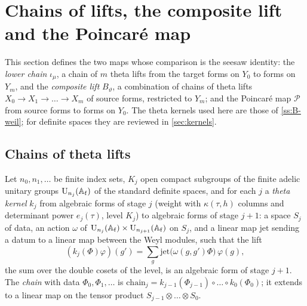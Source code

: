 \section{Chains of lifts, the composite lift and the Poincar\'e map}\label{sec:chains}

This section defines the two maps whose comparison is the seesaw identity: the \emph{lower chain}
$\iota_\mu$, a chain of $m$ theta lifts from the target forms on $Y_0$ to forms on $Y_m$, and the
\emph{composite lift} $B_\vartheta$, a combination of chains of theta lifts $X_0\to X_1\to\dots\to X_m$ of source
forms, restricted to $Y_m$; and the Poincar\'e map $\mathcal P$ from source forms to forms on $Y_0$. The
theta kernels used here are those of \cref{ss:B-weil}; for definite spaces they are reviewed in
\cref{sec:kernels}.

\subsection{Chains of theta lifts}\label{ss:chain-lifts}
Let $n_0,n_1,\dots$ be finite index sets, $K_j$ open compact subgroups of the finite adelic unitary groups
$\operatorname{U}_{n_j}(\mathbb{A}_{\mathrm f})$ of the standard definite spaces, and for each $j$ a \emph{theta kernel} $k_j$ from
algebraic forms of stage $j$ (weight with $\kappa(\tau,h)$ columns and determinant power $e_j(\tau)$, level
$K_j$) to algebraic forms of stage $j+1$: a space $S_j$ of data, an action $\omega$ of
$\operatorname{U}_{n_j}(\mathbb{A}_{\mathrm f})\times\operatorname{U}_{n_{j+1}}(\mathbb{A}_{\mathrm f})$ on $S_j$, and a linear map $\mathrm{jet}$ sending a
datum to a linear map between the Weyl modules, such that the lift
\[
  (k_j(\Phi)\varphi)(g')=\sum_{g}\mathrm{jet}\bigl(\omega(g,g')\Phi\bigr)\,\varphi(g),
\]
the sum over the double cosets of the level, is an algebraic form of stage $j+1$. The \emph{chain} with data
$\Phi_0,\Phi_1,\dots$ is $\mathrm{chain}_j=k_{j-1}(\Phi_{j-1})\circ\dots\circ k_0(\Phi_0)$; it extends to a linear
map on the tensor product $S_{j-1}\otimes\dots\otimes S_0$.

